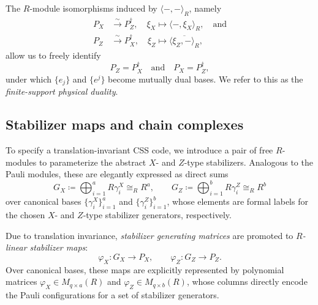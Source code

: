 \documentclass[aps,prx,english,superscriptaddress,twocolumn,tightenlines,showpacs,longbibliography,floatfix,amsfonts]{revtex4-2}
\theoremstyle{remark}
\theoremstyle{definition}
\begin{document}
The $R$-module isomorphisms induced by  $\langle -, - \rangle_R$, namely
\begin{equation}
	\begin{aligned}
		P_X &\xrightarrow{\sim} P_Z^\dagger,\quad \xi_X\mapsto \langle -, \xi_X \rangle_R, \quad \text{and} \\
		P_Z &\xrightarrow{\sim} P_X^\dagger,\quad \xi_Z\mapsto \overline{\langle \xi_Z, - \rangle_R},
	\end{aligned}
\end{equation}
allow us to freely identify
\begin{equation}
	P_Z = P_X^\dagger \quad \text{and} \quad P_X = P_Z^\dagger,
\end{equation}
under which $\{e_j\}$ and $\{e^j\}$ become mutually dual bases. We refer to this as the \emph{finite-support physical duality}.

\subsection{Stabilizer maps and chain complexes}

	To specify a translation-invariant CSS code, we introduce a pair of free $R$-modules to parameterize the abstract $X$- and $Z$-type stabilizers. Analogous to the Pauli modules, these are elegantly expressed as direct sums
	\begin{equation}
		G_X \coloneqq \bigoplus_{i=1}^a R \gamma_i^X \cong_R R^a, \qquad G_Z \coloneqq \bigoplus_{i=1}^b R \gamma_i^Z \cong_R R^b
	\end{equation}
	over canonical bases $\{\gamma_i^X\}_{i=1}^a$ and $\{\gamma_i^Z\}_{i=1}^b$, whose elements are formal labels for the chosen $X$- and $Z$-type stabilizer generators, respectively.

	Due to translation invariance, \emph{stabilizer generating matrices} are promoted to \emph{$R$-linear stabilizer maps}:
	\begin{equation}
		\varphi_X: G_X \to P_X, \qquad \varphi_Z: G_Z \to P_Z.
	\end{equation}
	Over canonical bases,
	these maps are explicitly represented by polynomial matrices $\varphi_X \in M_{q \times a}(R)$ and $\varphi_Z \in M_{q \times b}(R)$, whose columns directly encode the Pauli configurations for a set of stabilizer generators.
\end{document}
